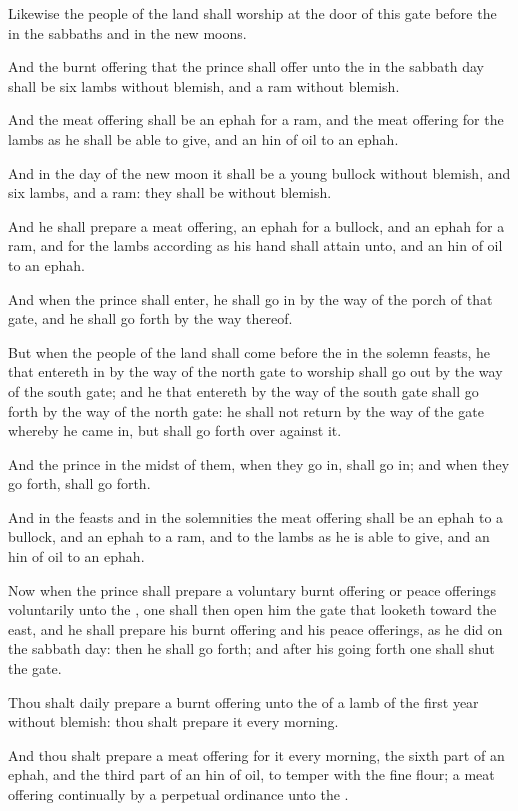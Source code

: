 \verse Likewise the people of the land shall worship at the door of this gate before the \LORD in the sabbaths and in the new moons.

\verse And the burnt offering that the prince shall offer unto the \LORD in the sabbath day shall be six lambs without blemish, and a ram without blemish.

\verse And the meat offering shall be an ephah for a ram, and the meat offering for the lambs as he shall be able to give, and an hin of oil to an ephah.

\verse And in the day of the new moon it shall be a young bullock without blemish, and six lambs, and a ram: they shall be without blemish.

\verse And he shall prepare a meat offering, an ephah for a bullock, and an ephah for a ram, and for the lambs according as his hand shall attain unto, and an hin of oil to an ephah.

\verse And when the prince shall enter, he shall go in by the way of the porch of that gate, and he shall go forth by the way thereof.

\verse But when the people of the land shall come before the \LORD in the solemn feasts, he that entereth in by the way of the north gate to worship shall go out by the way of the south gate; and he that entereth by the way of the south gate shall go forth by the way of the north gate: he shall not return by the way of the gate whereby he came in, but shall go forth over against it.

\verse And the prince in the midst of them, when they go in, shall go in; and when they go forth, shall go forth.

\verse And in the feasts and in the solemnities the meat offering shall be an ephah to a bullock, and an ephah to a ram, and to the lambs as he is able to give, and an hin of oil to an ephah.

\verse Now when the prince shall prepare a voluntary burnt offering or peace offerings voluntarily unto the \LORD, one shall then open him the gate that looketh toward the east, and he shall prepare his burnt offering and his peace offerings, as he did on the sabbath day: then he shall go forth; and after his going forth one shall shut the gate.

\verse Thou shalt daily prepare a burnt offering unto the \LORD of a lamb of the first year without blemish: thou shalt prepare it every morning.

\verse And thou shalt prepare a meat offering for it every morning, the sixth part of an ephah, and the third part of an hin of oil, to temper with the fine flour; a meat offering continually by a perpetual ordinance unto the \LORD.

